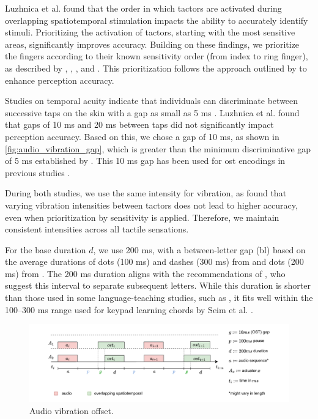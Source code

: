 Luzhnica et al. \cite{Luzhnica2017} found that the order in which tactors are activated during overlapping spatiotemporal stimulation impacts the ability to accurately identify stimuli. Prioritizing the activation of tactors, starting with the most sensitive areas, significantly improves accuracy. Building on these findings, we prioritize the fingers according to their known sensitivity order (from index to ring finger), as described by \cite{Luzhnica2017}, \cite{Hoggan2007}, \cite{VegaBermudez2001}, and \cite{Duncan2007}. This prioritization follows the approach outlined by \cite{Luzhnica2017} to enhance perception accuracy.

Studies on temporal acuity indicate that individuals can discriminate between successive taps on the skin with a gap as small as 5 ms \cite{Luzhnica2017, Katz2013}. Luzhnica et al. found that gaps of 10 ms and 20 ms between taps did not significantly impact perception accuracy. Based on this, we chose a gap of 10 ms, as shown in \autoref{fig:audio_vibration_gap}, which is greater than the minimum discriminative gap of 5 ms established by \cite{Luzhnica2017}. This 10 ms gap has been used for \gls{ost} encodings in previous studies \cite{Luzhnica2018, Luzhnica2016}.

During both studies, we use the same intensity for vibration, as \cite{Luzhnica2017} found that varying vibration intensities between tactors does not lead to higher accuracy, even when prioritization by sensitivity is applied. Therefore, we maintain consistent intensities across all tactile sensations.

For the base duration $d$, we use 200 ms, with a between-letter gap (bl) based on the average durations of dots (100 ms) and dashes (300 ms) from \cite{Seim2018} and dots (200 ms) from \cite{Pescara2019}. The 200 ms duration aligns with the recommendations of \cite{Luzhnica2018}, who suggest this interval to separate subsequent letters. While this duration is shorter than those used in some language-teaching studies, such as \cite{Seim2014a}, it fits well within the 100–300 ms range used for keypad learning chords by Seim et al. \cite{Seim2017}.


\begin{figure}
    \centering
    \includegraphics[width=\linewidth]{src/pictures/audio_vibration_diagram.drawio.pdf}
    \caption{Audio vibration offset.}
    \label{fig:audio_vibration_gap}
\end{figure}

